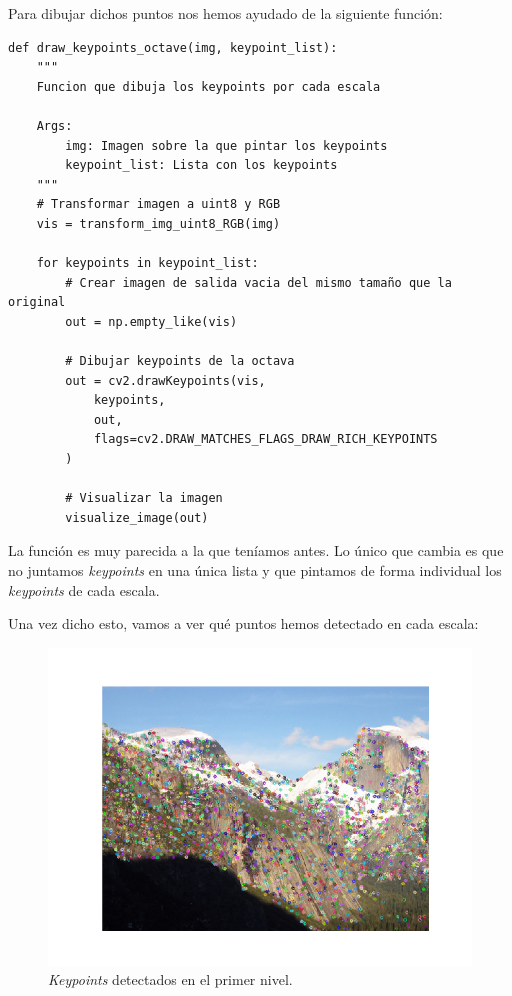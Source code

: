 \documentclass[11pt,a4paper]{article}
\begin{document}
Para dibujar dichos puntos nos hemos ayudado de la siguiente función:

\begin{lstlisting}
def draw_keypoints_octave(img, keypoint_list):
    """
    Funcion que dibuja los keypoints por cada escala

    Args:
        img: Imagen sobre la que pintar los keypoints
        keypoint_list: Lista con los keypoints
    """
    # Transformar imagen a uint8 y RGB
    vis = transform_img_uint8_RGB(img)

    for keypoints in keypoint_list:
        # Crear imagen de salida vacia del mismo tamaño que la original
        out = np.empty_like(vis)

        # Dibujar keypoints de la octava
        out = cv2.drawKeypoints(vis,
            keypoints,
            out,
            flags=cv2.DRAW_MATCHES_FLAGS_DRAW_RICH_KEYPOINTS
        )

        # Visualizar la imagen
        visualize_image(out)
\end{lstlisting}

La función es muy parecida a la que teníamos antes. Lo único que cambia es que no juntamos
\textit{keypoints} en una única lista y que pintamos de forma individual los \textit{keypoints}
de cada escala.

Una vez dicho esto, vamos a ver qué puntos hemos detectado en cada escala:

\begin{figure}[H]
	\centering
	\includegraphics[scale=0.6]{img/scale0}
	\caption{\textit{Keypoints} detectados en el primer nivel.}
	\label{fig:scale0}
\end{figure}
\end{document}
